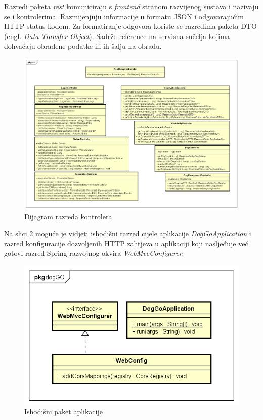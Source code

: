 		    \noindent Razredi paketa \textit{rest} komuniciraju s \textit{frontend} stranom razvijenog sustava i nazivaju se i kontrolerima. Razmijenjuju informacije u formatu JSON i odgovarajućim HTTP status kodom. Za formatiranje odgovora koriste se razredima paketa DTO (engl. \textit{Data Transfer Object}). Sadrže reference na servisna sučelja kojima dohvaćaju obrađene podatke ili ih šalju na obradu.
		    
		    \bigskip
		    
		    \begin{figure}[H]
    			    \includegraphics[scale=0.35]{dijagrami/classdiagram-rest.png}
    			    \centering
    			    \caption{Dijagram razreda kontrolera}
    			    \label{fig:classdiagram-rest}
		    \end{figure}
		    
		    \bigskip
		    
		    \noindent Na slici \ref{fig:classdiagram-doggo} moguće je vidjeti ishodišni razred cijele aplikacije \textit{DogGoApplication} i razred konfiguracije dozvoljenih HTTP zahtjeva u aplikaciji koji nasljeđuje već gotovi razred Spring razvojnog okvira \textit{WebMvcConfigurer}.
		    
		    \bigskip
		    
		     \begin{figure}[H]
    			    \includegraphics[scale=0.35]{dijagrami/classdiagram-doggo.png}
    			    \centering
    			    \caption{Ishodišni paket aplikacije}
    			    \label{fig:classdiagram-doggo}
		    \end{figure}
		    
